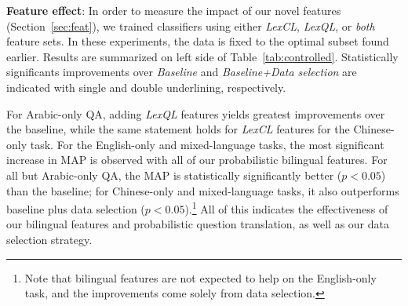 \documentclass{sig-alternate-05-2015}
\begin{document}

\textbf{Feature effect}: In order to measure the impact of our novel features (Section~\ref{sec:feat}), we trained classifiers using either
\emph{LexCL}, \emph{LexQL}, or \emph{both} feature sets. In these experiments, the data is fixed to the
optimal subset found earlier. Results are summarized on left side of Table~\ref{tab:controlled}. Statistically
significants improvements over {\em Baseline} and {\em Baseline+Data selection} are indicated with single 
and double underlining, respectively.
 
For Arabic-only QA, adding \emph{LexQL} features yields greatest improvements over the baseline, 
while the same statement holds for \emph{LexCL} features for the Chinese-only task.
For the English-only and mixed-language tasks, the most significant increase in MAP is observed 
with all of our probabilistic bilingual features. For all but Arabic-only QA, the MAP is statistically significantly 
better ($p<0.05$) than the baseline; for Chinese-only and mixed-language tasks, it also outperforms baseline 
plus data selection ($p<0.05$).\footnote{Note that bilingual features are not expected to help on the 
English-only task, and the improvements come solely from data selection.}
All of this indicates the effectiveness of our bilingual features and probabilistic question translation, 
as well as our data selection strategy.
\end{document}

